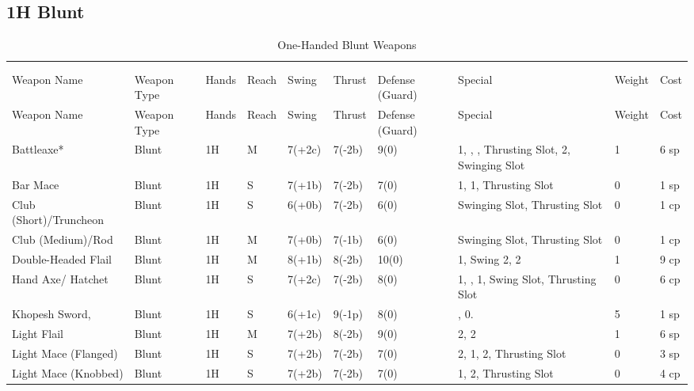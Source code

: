 \documentclass[oneside,11pt,english]{book}
\begin{document}
\subsection{1H Blunt}\vspace{-15pt}
\begin{longtabu} to 1\linewidth {X[2,l]XX[-1,c]X[-1,c]XXX[-1,c]X[2,l]X[-3,c]X[-3,r]}
	\captionsetup{labelformat=blank,textformat=empty}
	\caption{One-Handed Blunt Weapons}\vspace{-15pt}\\
	\label{tab:1H Blunt}\\
		Weapon Name						&Weapon Type	&Hands&Reach&Swing&Thrust&Defense (Guard)&Special						&Weight	&Cost\\\toprule\endfirsthead
Weapon Name						&Weapon Type	&Hands&Reach&Swing&Thrust&Defense (Guard)&Special						&Weight	&Cost\\\toprule\endhead
Battleaxe* &Blunt &1H &M &7(+2c) &7(-2b) &9(0)&  1, , , Thrusting Slot,  2, Swinging Slot &1 &6 sp\\
Bar Mace &Blunt &1H &S &7(+1b) &7(-2b) &7(0)&  1,  1, Thrusting Slot &0 &1 sp\\
Club (Short)/Truncheon &Blunt &1H &S &6(+0b) &7(-2b) &6(0)& Swinging Slot, Thrusting Slot &0 &1 cp\\
Club (Medium)/Rod &Blunt &1H &M &7(+0b) &7(-1b) &6(0)& Swinging Slot, Thrusting Slot &0 &1 cp\\
Double-Headed Flail &Blunt &1H &M &8(+1b) &8(-2b) &10(0)&  1,  Swing 2,  2 &1 &9 cp\\
Hand Axe/ Hatchet &Blunt &1H &S &7(+2c) &7(-2b) &8(0)&  1, ,  1, Swing Slot, Thrusting Slot &0 &6 cp\\
Khopesh Sword, &Blunt &1H &S &6(+1c) &9(-1p) &8(0)& ,  0.&5 &1 sp\\
Light Flail &Blunt &1H &M &7(+2b) &8(-2b) &9(0)&  2,  2 &1 &6 sp\\
Light Mace (Flanged) &Blunt &1H &S &7(+2b) &7(-2b) &7(0)&  2,  1,  2, Thrusting Slot &0 &3 sp\\
Light Mace (Knobbed) &Blunt &1H &S &7(+2b) &7(-2b) &7(0)&  1,  2, Thrusting Slot &0 &4 cp\\

\end{longtabu}
\end{document}
